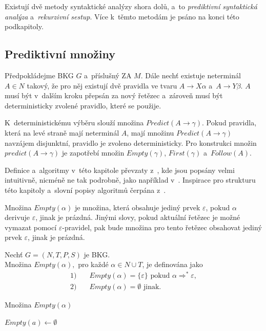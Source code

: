 Existují dvě metody syntaktické analýzy shora dolů, a~to \emph{prediktivní syntaktická analýza} a~\emph{rekurzivní sestup}.
Více k~těmto metodám je psáno na konci této podkapitoly.

\subsection*{Prediktivní množiny}
Předpokládejme BKG $G$ a~příslušný ZA $M$.
Dále nechť existuje neterminál $A \in N$ takový, že pro něj existují dvě pravidla ve tvaru $A \rightarrow X\alpha$ a~$A \rightarrow Y\beta$.
$A$ musí být v~dalším kroku přepsán za nový řetězec a~zároveň musí být deterministicky zvolené pravidlo, které se použije.

K~deterministickému výběru slouží množina $Predict(A \rightarrow \gamma)$.
Pokud pravidla, která na levé straně mají neterminál $A$, mají množinu $Predict(A \rightarrow \gamma)$ navzájem disjunktní, pravidlo je zvoleno deterministicky.
Pro konstrukci množin $predict(A \rightarrow \gamma)$ je zapotřebí množin $Empty(\gamma)$, $First(\gamma)$ a~$Follow(A)$. 

Definice a~algoritmy v~této kapitole převzaty z~\cite{meduna2017sa-shora-dolu,kunda2022}, kde jsou popsány velmi intuitivně, nicméně ne tak podrobně, jako například v~\cite{medunaElementsOfCompDesign}.
Inspirace pro strukturu této kapitoly a~slovní popisy algoritmů čerpána z~\cite{kunda2022}.

Množina $Empty(\alpha)$ je množina, která obsahuje jediný prvek $\varepsilon$, pokud $\alpha$ derivuje $\varepsilon$, jinak je prázdná.
Jinými slovy, pokud aktuální řetězec je možné vymazat pomocí $\varepsilon$-pravidel, pak bude množina pro tento řetězec obsahovat jediný prvek $\varepsilon$, jinak je prázdná.
\begin{definition}\label{def_mnozina_empty}
    Nechť $G = (N, T, P, S)$ je BKG. \\
    Množina $Empty(\alpha),$ pro každé $\alpha \in N \cup T$, je definována jako
    \begin{align*}
        1) & \quad Empty(\alpha) = \{\varepsilon\} \text{ pokud } \alpha \Rightarrow^* \varepsilon, \\
        2) & \quad Empty(\alpha) = \emptyset \text{ jinak}.
    \end{align*}
\end{definition}

\begin{algorithm}[ht]
	\caption{Množina $Empty(\alpha)$}
	\label{alg_mnozina_empty}
	\begin{algorithmic}[1]
		\NewLine
		\State $Empty(a) \gets \emptyset$
		\EndFor
	\end{algorithmic}
\end{algorithm}
\addtocounter{algorithm}{-1}

